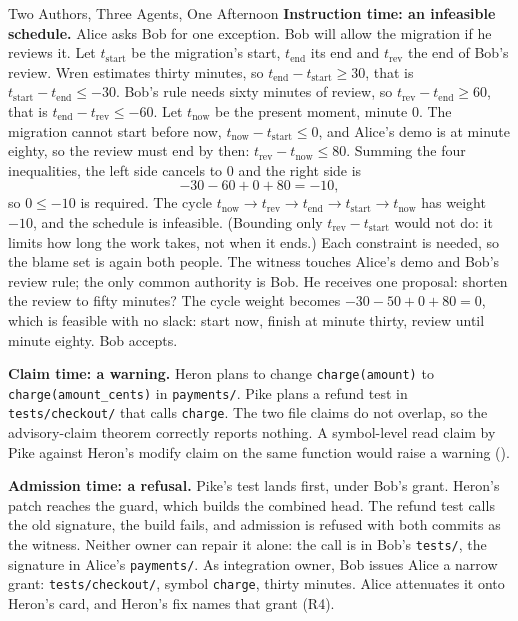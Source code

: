 \begin{pdexample}{Two Authors, Three Agents, One Afternoon}
\textbf{Instruction time: an infeasible schedule.} Alice asks Bob for one
exception. Bob will allow the migration if he reviews it. Let $t_{\mathrm{start}}$ be the
migration's start, $t_{\mathrm{end}}$ its end and $t_{\mathrm{rev}}$ the end of Bob's review. Wren
estimates thirty minutes, so $t_{\mathrm{end}}-t_{\mathrm{start}}\ge30$, that is $t_{\mathrm{start}}-t_{\mathrm{end}}\le-30$. Bob's rule needs
sixty minutes of review, so $t_{\mathrm{rev}}-t_{\mathrm{end}}\ge60$, that is $t_{\mathrm{end}}-t_{\mathrm{rev}}\le-60$. Let $t_{\mathrm{now}}$ be the
present moment, minute $0$. The migration cannot start before now, $t_{\mathrm{now}}-t_{\mathrm{start}}\le0$,
and Alice's demo is at minute eighty, so the review must end by then:
$t_{\mathrm{rev}}-t_{\mathrm{now}}\le80$. Summing the four inequalities, the left side cancels to $0$ and the
right side is
\[
-30-60+0+80=-10,
\]
so $0\le-10$ is required. The cycle $t_{\mathrm{now}}\to t_{\mathrm{rev}}\to t_{\mathrm{end}}\to t_{\mathrm{start}}\to t_{\mathrm{now}}$ has weight $-10$,
and the schedule is infeasible. (Bounding only $t_{\mathrm{rev}}-t_{\mathrm{start}}$ would not do: it limits
how long the work takes, not when it ends.) Each constraint is needed, so the blame set is
again both people. The witness touches Alice's demo and Bob's review rule; the
only common authority is Bob. He receives one proposal: shorten the review to
fifty minutes? The cycle weight becomes $-30-50+0+80=0$, which is feasible with
no slack: start now, finish at minute thirty, review until minute eighty. Bob
accepts.

\textbf{Claim time: a warning.} Heron plans to change \texttt{charge(amount)}
to \texttt{charge(amount\_cents)} in \texttt{payments/}. Pike plans a refund
test in \texttt{tests/checkout/} that calls \texttt{charge}. The two file
claims do not overlap, so the advisory-claim theorem correctly reports
nothing. A symbol-level read claim by Pike against Heron's modify claim on the
same function would raise a warning (\Vision).

\textbf{Admission time: a refusal.} Pike's test lands first, under Bob's grant.
Heron's patch reaches the guard, which builds the combined head. The refund
test calls the old signature, the build fails, and admission is refused with
both commits as the witness. Neither owner can repair it alone: the call is in
Bob's \texttt{tests/}, the signature in Alice's \texttt{payments/}. As
integration owner, Bob issues Alice a narrow grant: \texttt{tests/checkout/},
symbol \texttt{charge}, thirty minutes. Alice attenuates it onto Heron's card,
and Heron's fix names that grant (R4).


\end{pdexample}
